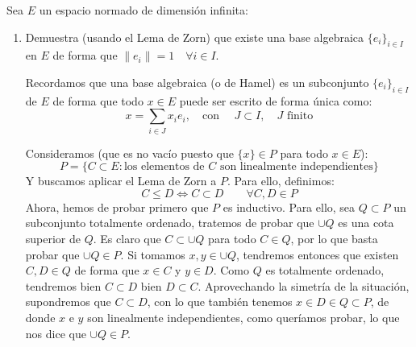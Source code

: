 \begin{ejercicio}
    Sea $E$ un espacio normado de dimensión infinita:
    \begin{enumerate}[label=\alph*)]
        \item Demuestra (usando el Lema de Zorn) que existe una base algebraica $\{e_i\}_{i \in I}$ en $E$ de forma que $\|e_i\| = 1\quad \forall i \in I$.

            Recordamos que una base algebraica (o de Hamel) es un subconjunto $\{e_i\}_{i \in I}$ de $E$ de forma que todo $x\in E$ puede ser escrito de forma única como:
            \begin{equation*}
                x = \sum_{i \in J} x_i e_i, \quad \text{con\ } \quad J\subset I,\quad  J \text{\ finito}
            \end{equation*}

            Consideramos (que es no vacío puesto que $\{x\}\in P$ para todo $x\in E$):
            \begin{equation*}
                P = \{C\subset E : \text{los elementos de\ } C \text{\ son linealmente independientes}\}
            \end{equation*}
            Y buscamos aplicar el Lema de Zorn a $P$. Para ello, definimos:
            \begin{equation*}
                C \leq D \Longleftrightarrow C \subset D \qquad \forall C,D\in P
            \end{equation*}
            Ahora, hemos de probar primero que $P$ es inductivo. Para ello, sea $Q\subset P$ un subconjunto totalmente ordenado, tratemos de probar que $\cup Q$ es una cota superior de $Q$. Es claro que $C\subset \cup Q$ para todo $C\in Q$, por lo que basta probar que $\cup Q \in P$. Si tomamos $x,y\in \cup Q$, tendremos entonces que existen $C,D\in Q$ de forma que $x\in C$ y $y\in D$. Como $Q$ es totalmente ordenado, tendremos bien $C\subset D$ bien $D\subset C$. Aprovechando la simetría de la situación, supondremos que $C\subset D$, con lo que también tenemos $x\in D\in Q\subset P$, de donde $x$ e $y$ son linealmente independientes, como queríamos probar, lo que nos dice que $\cup Q \in P$.


\end{enumerate}
\end{ejercicio}
